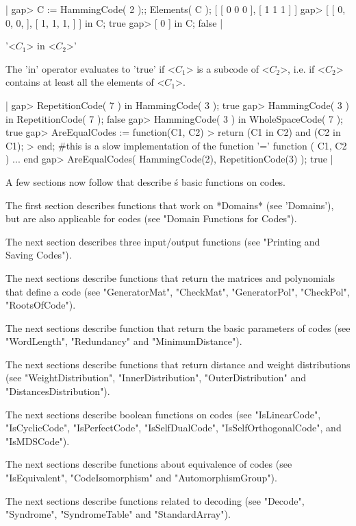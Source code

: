 |    gap> C := HammingCode( 2 );; Elements( C );
    [ [ 0 0 0 ], [ 1 1 1 ] ]
    gap> [ [ 0, 0, 0, ], [ 1, 1, 1, ] ] in C;
    true
    gap> [ 0 ] in C;
    false |

'<$C_1$> in <$C_2$>'

The 'in' operator evaluates to 'true' if <$C_1$> is a subcode of <$C_2$>,
i.e.  if <$C_2$> contains at least all the elements of <$C_1$>.

|    gap> RepetitionCode( 7 ) in HammingCode( 3 );
    true
    gap> HammingCode( 3 ) in RepetitionCode( 7 );
    false
    gap> HammingCode( 3 ) in WholeSpaceCode( 7 );
    true
    gap> AreEqualCodes := function(C1, C2)
    > return (C1 in C2) and (C2 in C1);
    > end;    #this is a slow implementation of the function '='
    function ( C1, C2 ) ... end
    gap> AreEqualCodes( HammingCode(2), RepetitionCode(3) );
    true |


A few sections  now follow that describe  {\GUAVA}\'s  basic functions on
codes.

The first section describes {\GAP} functions that  work on *Domains* (see
'Domains'), but are also applicable for  codes (see "Domain Functions for
Codes").

The next  section  describes  three  {\GAP}  input/output  functions (see
"Printing and Saving Codes").

The  next  sections describe  functions   that return  the  matrices  and
polynomials   that   define   a code  (see   "GeneratorMat",  "CheckMat",
"GeneratorPol", "CheckPol", "RootsOfCode").

The next  sections describe function that return  the basic parameters of
codes (see "WordLength", "Redundancy" and "MinimumDistance").

The next  sections  describe functions that  return   distance and weight
distributions   (see      "WeightDistribution",      "InnerDistribution",
"OuterDistribution" and "DistancesDistribution").

The   next   sections   describe    boolean  functions on     codes  (see
"IsLinearCode",   "IsCyclicCode",    "IsPerfectCode",   "IsSelfDualCode",
"IsSelfOrthogonalCode", and "IsMDSCode").

The next  sections describe  functions about   equivalence of codes  (see
"IsEquivalent", "CodeIsomorphism" and "AutomorphismGroup").

The  next sections describe  functions related to decoding (see "Decode",
"Syndrome", "SyndromeTable" and "StandardArray").

